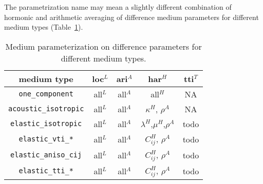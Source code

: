The parametrization name may mean a slightly different combination of hormonic and arithmetic
averaging of difference medium parameters for different medium types (Table~\ref{table_parameterization}).

\begin{table}[h!]
\centering
\begin{tabular}{| c | c | c | c | c |}
\hline
   medium type               &   loc$^L$   &   ari$^A$   & har$^H$  & tti$^T$ \\
\hline
   \verb|one_component|      &    all$^L$  &   all$^A$   & all$^H$  &  NA \\
\hline
   \verb|acoustic_isotropic| &    all$^L$  &   all$^A$   &$\kappa^H$, $\rho^A$ & NA \\
\hline
   \verb|elastic_isotropic|  &    all$^L$  &   all$^A$   &$\lambda^H$,$\mu^H$,$\rho^A$ &  todo \\
\hline
   \verb|elastic_vti_*|      &    all$^L$  &   all$^A$   &$C_{ij}^H$, $\rho^A$ & todo \\
\hline
   \verb|elastic_aniso_cij|  &    all$^L$  &   all$^A$   &$C_{ij}^H$, $\rho^A$ & todo \\
\hline
   \verb|elastic_tti_*|      &    all$^L$  &   all$^A$   &$C_{ij}^H$, $\rho^A$ & todo \\
\hline
\end{tabular}
\caption{Medium parameterization on difference parameters for different medium types.}
\label{table_parameterization}
\end{table}




